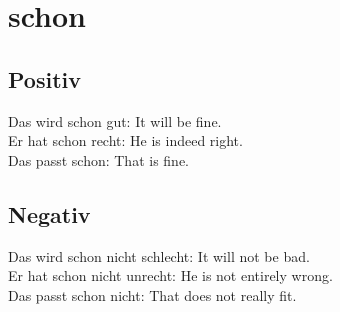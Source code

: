 \documentclass[a4paper]{article}
\begin{document}
    
    \section{schon}
        
        \subsection{Positiv}
            Das wird schon gut: It will be fine. \\
            Er hat schon recht: He is indeed right. \\
            Das passt schon: That is fine. \\
        
        \subsection{Negativ}
            Das wird schon nicht schlecht: It will not be bad. \\
            Er hat schon nicht unrecht: He is not entirely wrong. \\
            Das passt schon nicht: That does not really fit. \\
\end{document}
